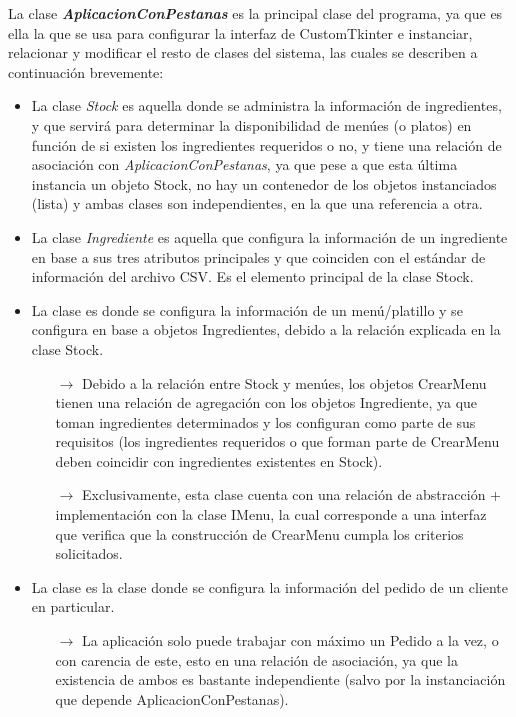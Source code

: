 \documentclass[a4paper,12pt]{article}
\begin{document}
La clase \textbf{\textit{AplicacionConPestanas}} es la principal clase del programa, ya que es ella la que se usa para configurar la interfaz de CustomTkinter e instanciar, relacionar y modificar el resto de clases del sistema, las cuales se describen a continuación brevemente:
\begin{itemize}
    \item La clase \textit{Stock} es aquella donde se administra la información de ingredientes, y que servirá para determinar la disponibilidad de menúes (o platos) en función de si existen los ingredientes requeridos o no, y tiene una relación de asociación con \textit{AplicacionConPestanas}, ya que pese a que esta última instancia un objeto Stock, no hay un contenedor de los objetos instanciados (lista) y ambas clases son independientes, en la que una referencia a otra.
    \item La clase \textit{Ingrediente} es aquella que configura la información de un ingrediente en base a sus tres atributos principales y que coinciden con el estándar de información del archivo CSV. Es el elemento principal de la clase Stock.
    \item La clase  es donde se configura la información de un menú/platillo y se configura en base a objetos Ingredientes, debido a la relación explicada en la clase Stock. 
    \begin{itemize}
        \item[$\rightarrow$] Debido a la relación entre Stock y menúes, los objetos CrearMenu tienen una relación de agregación con los objetos Ingrediente, ya que toman ingredientes determinados y los configuran como parte de sus requisitos (los ingredientes requeridos o que forman parte de CrearMenu deben coincidir con ingredientes existentes en Stock).
        \item[$\rightarrow$] Exclusivamente, esta clase cuenta con una relación de abstracción + implementación con la clase IMenu, la cual corresponde a una interfaz que verifica que la construcción de CrearMenu cumpla los criterios solicitados.
    \end{itemize}
    \item La clase  es la clase donde se configura la información del pedido de un cliente en particular.
        \begin{itemize}
            \item[$\rightarrow$] La aplicación solo puede trabajar con máximo un Pedido a la vez, o con carencia de este, esto en una relación de asociación, ya que la existencia de ambos es bastante independiente (salvo por la instanciación que depende AplicacionConPestanas).

\end{itemize}
\end{itemize}
\end{document}
